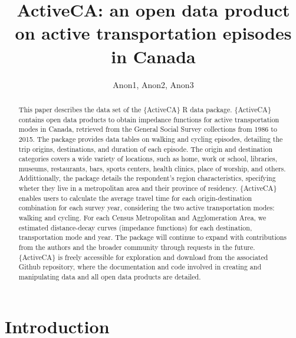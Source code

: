 \documentclass[Royal,times,sageh]{sagej}
\begin{document}

\title{ActiveCA: an open data product on active transportation episodes
in Canada}

\runninghead{}

\author{Anon1\affilnum{}, Anon2\affilnum{}, Anon3\affilnum{}}

\affiliation{\affilnum{}{}}



\begin{abstract}
This paper describes the data set of the \{ActiveCA\} R data package.
\{ActiveCA\} contains open data products to obtain impedance functions
for active transportation modes in Canada, retrieved from the General
Social Survey collections from 1986 to 2015. The package provides data
tables on walking and cycling episodes, detailing the trip origins,
destinations, and duration of each episode. The origin and destination
categories covers a wide variety of locations, such as home, work or
school, libraries, museums, restaurants, bars, sports centers, health
clinics, place of worship, and others. Addittionally, the package
details the respondent's region characteristics, specifying wheter they
live in a metropolitan area and their province of residency.
\{ActiveCA\} enables users to calculate the average travel time for each
origin-destination combination for each survey year, considering the two
active transportation modes: walking and cycling. For each Census
Metropolitan and Agglomeration Area, we estimated distance-decay curves
(impedance functions) for each destination, transportation mode and
year. The package will continue to expand with contributions from the
authors and the broader community through requests in the future.
\{ActiveCA\} is freely accessible for exploration and download from the
associated Github repository, where the documentation and code involved
in creating and manipulating data and all open data products are
detailed.
\end{abstract}


\maketitle

\hypertarget{introduction}{%
\section{Introduction}\label{introduction}}
\end{document}
